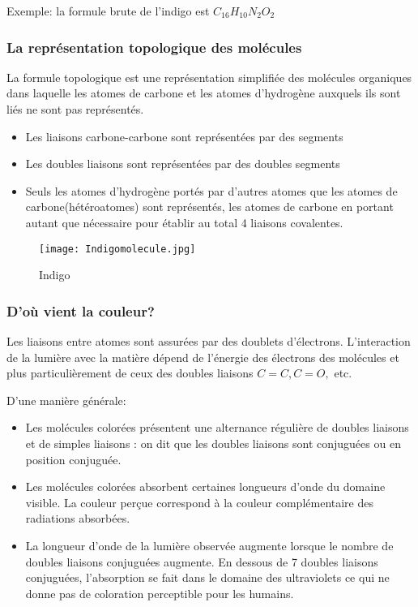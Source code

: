 \documentclass{article}
\begin{document}
 Exemple: la formule brute de l'indigo est $C_{16}H_{10}N_{2}O_{2}$
 
 \subsubsection{La représentation topologique des molécules}
La formule topologique est une représentation simplifiée des molécules organiques dans laquelle les atomes de carbone et les atomes d’hydrogène auxquels ils sont liés ne sont pas représentés.

\begin{itemize}
    \item Les liaisons carbone-carbone sont représentées par des segments
    \item Les doubles liaisons sont représentées par des doubles segments
    \item Seuls les atomes d’hydrogène portés par d’autres atomes que les atomes de carbone(hétéroatomes) sont représentés, les atomes de carbone en portant autant que nécessaire pour établir au total 4 liaisons covalentes.
\end{itemize}

\begin{figure}[H]
    \centering
    \texttt{[image: Indigomolecule.jpg]}
    \caption{Indigo}
    \label{fig:my_label}
\end{figure}


\subsubsection{D'où vient la couleur?}

Les liaisons entre atomes sont assurées par des doublets d'électrons. L'interaction de la lumière avec la matière dépend de l'énergie des électrons des molécules et plus particulièrement de ceux des doubles liaisons $C=C, C=O,$ etc. \medskip

D'une manière générale:

\begin{itemize}
    \item Les molécules colorées présentent une alternance régulière de doubles liaisons et de simples liaisons : on dit que les doubles liaisons sont conjuguées ou en position conjuguée.
    \item Les molécules colorées absorbent certaines longueurs d'onde du domaine visible. La couleur perçue correspond à la couleur complémentaire des radiations absorbées.
    \item La longueur d'onde de la lumière observée augmente lorsque le nombre de doubles liaisons conjuguées augmente. En dessous de 7 doubles liaisons conjuguées, l’absorption se fait dans le domaine des ultraviolets ce qui ne donne pas de coloration perceptible pour les humains.
\end{itemize}
\end{document}
